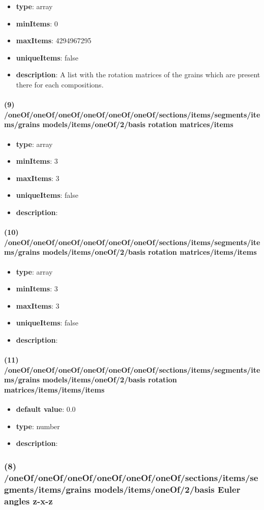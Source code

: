 \begin{itemize}[leftmargin=8em]\item {\bf type}: array
\item {\bf minItems}: 0
\item {\bf maxItems}: 4294967295
\item {\bf uniqueItems}: false
\item {\bf description}: A list with the rotation matrices of the grains which are present there for each compositions.
\end{itemize}\paragraph{(9) /oneOf/oneOf/oneOf/oneOf/oneOf/oneOf/sections/items/segments/items/grains models/items/oneOf/2/basis rotation matrices/items}
\begin{itemize}[leftmargin=9em]\item {\bf type}: array
\item {\bf minItems}: 3
\item {\bf maxItems}: 3
\item {\bf uniqueItems}: false
\item {\bf description}: 
\end{itemize}\paragraph{(10) /oneOf/oneOf/oneOf/oneOf/oneOf/oneOf/sections/items/segments/items/grains models/items/oneOf/2/basis rotation matrices/items/items}
\begin{itemize}[leftmargin=10em]\item {\bf type}: array
\item {\bf minItems}: 3
\item {\bf maxItems}: 3
\item {\bf uniqueItems}: false
\item {\bf description}: 
\end{itemize}\paragraph{(11) /oneOf/oneOf/oneOf/oneOf/oneOf/oneOf/sections/items/segments/items/grains models/items/oneOf/2/basis rotation matrices/items/items/items}
\begin{itemize}[leftmargin=11em]\item {\bf default value}: 0.0
\item {\bf type}: number
\item {\bf description}: 
\end{itemize}\subsubsection{(8) /oneOf/oneOf/oneOf/oneOf/oneOf/oneOf/sections/items/segments/items/grains models/items/oneOf/2/basis Euler angles z-x-z}
